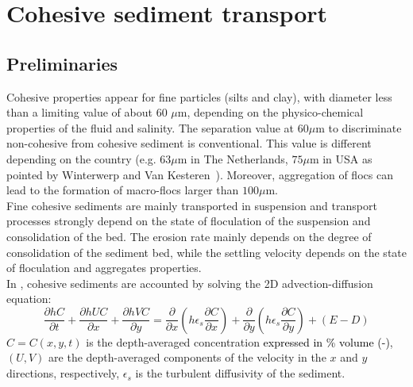 \chapter[Cohesive sediment]{Cohesive sediment transport}

\section{Preliminaries}
Cohesive properties appear for fine particles (silts and clay), with diameter less than a limiting value of about 60 $\mu$m, depending on the physico-chemical 
properties of the fluid and salinity. The separation value at $60\mu$m to discriminate non-cohesive from cohesive sediment is conventional. This value is different depending on the country (e.g. $63\mu$m in The Netherlands, $75\mu$m in USA as pointed by Winterwerp and Van Kesteren~\cite{Winterwerp}). Moreover, aggregation of flocs can lead to the formation of macro-flocs larger than $100\mu$m.\\

Fine cohesive sediments are mainly transported in suspension and transport processes strongly depend on the state of floculation of the suspension and consolidation of the bed. The erosion rate mainly depends on the degree of consolidation of the sediment bed, while the settling velocity depends on the state of floculation and aggregates properties.\\

In \sisyphe{}, cohesive sediments are accounted by solving the 2D advection-diffusion equation:
\begin{equation*}
\frac{\partial hC}{\partial t} + \frac{\partial hUC}{\partial x} + \frac{\partial hVC}{\partial y} =
\frac{\partial}{\partial x}\left(h\epsilon_s\frac{\partial C}{\partial x}\right) +
\frac{\partial}{\partial y}\left(h\epsilon_s\frac{\partial C}{\partial y}\right) + (E-D)
\end{equation*}
$C=C(x,y,t)$ is the depth-averaged concentration \textcolor{black}{expressed in \% volume (-)}, $(U,V)$ are the depth-averaged components of the velocity in the $x$ and $y$ directions, respectively, $\epsilon_s$ is the turbulent diffusivity of the sediment.

